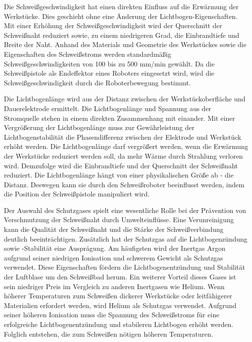 Die Schweißgeschwindigkeit hat einen direkten Einfluss auf die Erwärmung der Werkstücke. Dies geschieht ohne eine Änderung der Lichtbogen-Eigenschaften. Mit einer Erhöhung der Schweißgeschwindigkeit wird der Querschnitt der Schweißnaht reduziert sowie, zu einem niedrigeren Grad, die Einbrandtiefe und Breite der Naht. Anhand des Materials und Geometrie des Werkstückes sowie die Eigenschaften des Schweißstroms werden standardmäßig Schweißgeschwindigkeiten von 100 bis zu 500 mm/min gewählt. Da die Schweißpistole als Endeffektor eines Roboters eingesetzt wird, wird die Schweißgeschwindigkeit durch die Roboterbewegung bestimmt. \autocite[33]{Pires_WeldingRobots_2006}

Die Lichtbogenlänge wird aus der Distanz zwischen der Werkstückoberfläche und Dauerelektrode ermittelt. Die Lichtbogenlänge und Spannung aus der Stromquelle stehen in einem direkten Zusammenhang mit einander. Mit einer Vergrößerung der Lichtbogenlänge muss zur Gewährleistung der Lichtbogenstabilität die Phasendifferenz zwischen der Elektrode und Werkstück erhöht werden. Die Lichtbogenlänge darf vergrößert werden, wenn die Erwärmung der Werkstücke reduziert werden soll, da mehr Wärme durch Strahlung verloren wird. Demzufolge wird die Einbrandtiefe und der Querschnitt der Schweißnaht reduziert. Die Lichtbogenlänge hängt von einer physikalischen Größe ab - die Distanz. Deswegen kann sie durch den Schweißroboter beeinflusst werden, indem die Position der Schweißpistole manipuliert wird. \autocite[33]{Pires_WeldingRobots_2006}

Der Auswahl des Schutzgases spielt eine wesentliche Rolle bei der Prävention von Verschmutzung der Schweißnaht durch Umwelteinflüsse. Eine Verunreinigung kann die Qualität der Schweißnaht und die Stärke der Schweißverbindung deutlich beeinträchtigen. Zusätzlich hat der Schutzgas auf die Lichtbogenzündung sowie -Stabilität eine Ausprägung. Am häufigsten wird der Inertgas Argon aufgrund seiner niedrigen Ionisation und schwerem Gewicht als Schutzgas verwendet. Diese Eigenschaften fördern die Lichtbogenentzündung und Stabilität der Luftblase um den Schweißbad herum. Ein weiterer Vorteil dieses Gases ist sein niedriger Preis im Vergleich zu anderen Inertgasen wie Helium. Wenn höherer Temperaturen zum Schweißen dickerer Werkstücke oder leitfähigerer Materialien erfordert werden, wird Helium als Schutzgas verwendet. Aufgrund seiner höheren Ionisation muss die Spannung des Schweißstroms für eine erfolgreiche Lichtbogenentzündung und stabileren Lichtbogen erhöht werden. Folglich entstehen, die zum Schweißen nötigen höheren Temperaturen. \autocite[33-34]{Pires_WeldingRobots_2006}

